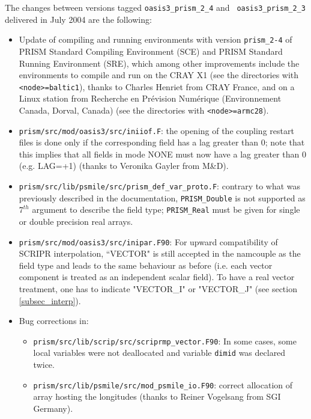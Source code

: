   The changes between versions tagged {\tt oasis3\_prism\_2\_4} and {\tt
    oasis3\_prism\_2\_3} delivered in July 2004 are the following:

\begin{itemize}

\item Update of compiling and running environments with version
  \texttt{prism\_2-4} of PRISM Standard Compiling Environment (SCE) and
  PRISM Standard Running Environment (SRE), which among other
  improvements include the environments to compile and run on the CRAY
  X1 (see the directories with \texttt{<node>=baltic1}), thanks to
  Charles Henriet from CRAY France, and on a Linux station from
  Recherche en Pr\'evision Num\'erique (Environnement Canada, Dorval,
  Canada) (see the directories with \texttt{<node>=armc28}).

\item \texttt{prism/src/mod/oasis3/src/iniiof.F}: the opening of the
  coupling restart files is done only if the corresponding field has a
  lag greater than 0; note that this implies that all fields in mode
  NONE must now have a lag greater than 0 (e.g. LAG=+1) (thanks to
  Veronika Gayler from M\&D).

\item \texttt{prism/src/lib/psmile/src/prism\_def\_var\_proto.F}:
 contrary to what was previously described in the documentation,
 \texttt{PRISM\_Double} is not supported as $7^{th}$ argument to
 describe the field type; {\tt PRISM\_Real} must be given for single
 or double precision real arrays.

\item \texttt{prism/src/mod/oasis3/src/inipar.F90}: For upward
   compatibility of SCRIPR interpolation, ``VECTOR" is still accepted
   in the namcouple as the field type 
   and leads to the same behaviour as before (i.e. each vector
   component is treated as an independent scalar field). To have a
   real vector treatment, one has to indicate "VECTOR\_I" or "VECTOR\_J"
   (see section \ref{subsec_interp}).

\item Bug corrections in: 
\begin{itemize}

\item \texttt{prism/src/lib/scrip/src/scriprmp\_vector.F90}: In some
 cases, some local variables were not deallocated and variable
 \texttt{dimid} was declared twice.

\item 
\texttt{prism/src/lib/psmile/src/mod\_psmile\_io.F90}: correct
allocation of array hosting the longitudes (thanks to Reiner Vogelsang
from SGI Germany).


\end{itemize}
\end{itemize}
